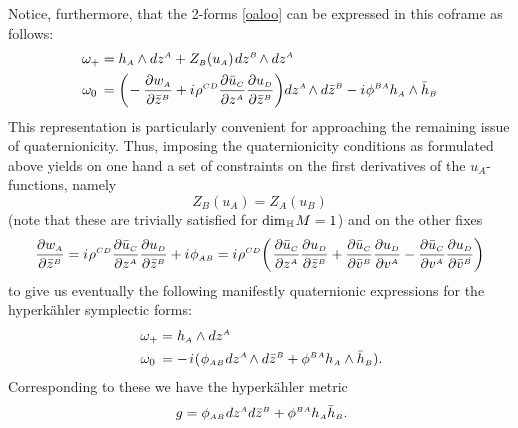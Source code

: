 \documentclass[11pt]{amsart}
\theoremstyle{remark}
\theoremstyle{remark}
\theoremstyle{definition}
\theoremstyle{definition}
\theoremstyle{definition}
\newcommand{\0}{{\scriptstyle 0'}} %
\newcommand{\1}{{\scriptstyle 1'}}
\newcommand{\A}{{\scriptscriptstyle A}} %
\newcommand{\B}{{\scriptscriptstyle B}}
\newcommand{\C}{{\scriptscriptstyle C}}
\newcommand{\D}{{\scriptscriptstyle D}}
\newcommand{\pt}{\hspace{1pt}} %
\newcommand{\hp}{\hspace{0.5pt}} %
\newcommand{\npt}{\hspace{-1pt}} %
\begin{document}
Notice, furthermore, that the 2-forms \eqref{oaloo} can be expressed in this coframe as follows:
\begin{equation}
\begin{aligned}
\omega_+ & = h_{\A} \wedge dz^{\A} + Z_{\B}(u_{\A})\pt dz^{\B} \npt \wedge dz^{\A} \\
\omega_0 \hspace{2pt} & =  \bigg( \! - \frac{\partial w_{\A}}{\partial \bar{z}^{\B}} + i \hp \rho^{\C\D} \frac{\partial \bar{u}_{\C}}{\partial z^{\A}} \frac{\partial u_{\D}}{\partial \bar{z}^{\B}}  \bigg) dz^{\A} \npt \wedge d\bar{z}^{\B} - i \hp \phi^{\B\A} h_{\A} \wedge \bar{h}_{\B}
\end{aligned}
\end{equation}
This representation is particularly convenient for approaching the remaining issue of qua\-ter\-ni\-o\-ni\-ci\-ty. Thus, imposing the quaternionicity conditions as formulated above yields on one hand a set of constraints on the first derivatives of the $u_{\A}$-functions, namely
\begin{equation} \label{u-con}
Z_{\B}(u_{\A}) = Z_{\A}(u_{\B})
\end{equation}
(note that these are trivially satisfied for $\dim_{\hp \mathbb{H}} \npt M = 1$) and on the other fixes
\begin{equation} \label{w-con}
\frac{\partial w_{\A}}{\partial \bar{z}^{\B}} 
=   i \hp \rho^{\C\D} \frac{\partial \bar{u}_{\C}}{\partial z^{\A}} \frac{\partial u_{\D}}{\partial \bar{z}^{\B}} + i \hp \phi_{\A\B}
= i \hp \rho^{\C\D} \bigg( \pt \frac{\partial \bar{u}_{\C}}{\partial z^{\A}} \frac{\partial u_{\D}}{\partial \bar{z}^{\B}}  + \frac{\partial \bar{u}_{\C}}{\partial \bar{v}^{\B}} \frac{\partial u_{\D}}{\partial v^{\A}} - \frac{\partial \bar{u}_{\C}}{\partial v^{\A}} \frac{\partial u_{\D}}{\partial \bar{v}^{\B}} \bigg)
\end{equation}
to give us eventually the following manifestly quaternionic expressions for the hyperk\"ahler symplectic forms:
\begin{equation} \label{HK_sfs}
\begin{aligned}
\omega_+ & = h_{\A} \wedge dz^{\A} \\
\omega_0 \hspace{2pt} & = -\pt i \hp (\hp \phi_{\A\B} \hp dz^{\A} \npt \wedge d\bar{z}^{\B} + \phi^{\B\A} h_{\A} \wedge \bar{h}_{\B}) \rlap{.}
\end{aligned}
\end{equation}
Corresponding to these we have the hyperk\"ahler metric
\begin{equation} \label{HK_m}
g = \phi_{\A\B} \hp dz^{\A} d\bar{z}^{\B} + \phi^{\B\A} h_{\A} \bar{h}_{\B} \rlap{.}
\end{equation}
\end{document}
